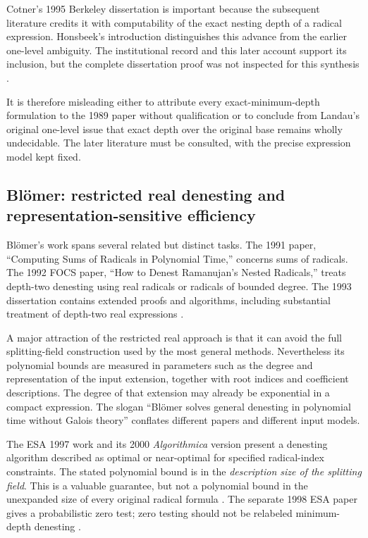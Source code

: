 \documentclass[11pt,letterpaper]{article}
\numberwithin{equation}{section}
\theoremstyle{definition}
\theoremstyle{remark}
\begin{document}
Cotner's 1995 Berkeley dissertation is important because the subsequent literature credits it with computability of the exact nesting depth of a radical expression. Honsbeek's introduction distinguishes this advance from the earlier one-level ambiguity. The institutional record and this later account support its inclusion, but the complete dissertation proof was not inspected for this synthesis \cite{cotner,honsbeek}.

It is therefore misleading either to attribute every exact-minimum-depth formulation to the 1989 paper without qualification or to conclude from Landau's original one-level issue that exact depth over the original base remains wholly undecidable. The later literature must be consulted, with the precise expression model kept fixed.

\subsection{Bl\"omer: restricted real denesting and representation-sensitive efficiency}
Bl\"omer's work spans several related but distinct tasks. The 1991 paper, ``Computing Sums of Radicals in Polynomial Time,'' concerns sums of radicals. The 1992 FOCS paper, ``How to Denest Ramanujan's Nested Radicals,'' treats depth-two denesting using real radicals or radicals of bounded degree. The 1993 dissertation contains extended proofs and algorithms, including substantial treatment of depth-two real expressions \cite{blomer91,blomer92,blomerthesis}.

A major attraction of the restricted real approach is that it can avoid the full splitting-field construction used by the most general methods. Nevertheless its polynomial bounds are measured in parameters such as the degree and representation of the input extension, together with root indices and coefficient descriptions. The degree of that extension may already be exponential in a compact expression. The slogan ``Bl\"omer solves general denesting in polynomial time without Galois theory'' conflates different papers and different input models.

The ESA 1997 work and its 2000 \emph{Algorithmica} version present a denesting algorithm described as optimal or near-optimal for specified radical-index constraints. The stated polynomial bound is in the \emph{description size of the splitting field}. This is a valuable guarantee, but not a polynomial bound in the unexpanded size of every original radical formula \cite{blomer2000}. The separate 1998 ESA paper gives a probabilistic zero test; zero testing should not be relabeled minimum-depth denesting \cite{blomer98}.
\end{document}
